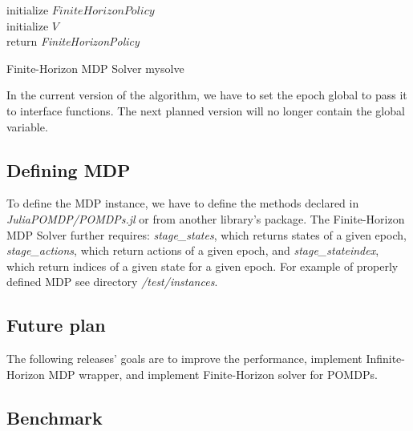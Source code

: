  \LinesNumbered
\begin{algorithm}
\SetAlgoLined
initialize $FiniteHorizonPolicy$ \\
initialize $V$ \\
return \textit{FiniteHorizonPolicy}
\caption{Finite-Horizon MDP Solver mysolve}
\end{algorithm}

In the current version of the algorithm, we have to set the epoch global to pass it to interface functions. The next planned version will no longer contain the global variable.

\subsection{Defining MDP}

To define the MDP instance, we have to define the methods declared in \textit{JuliaPOMDP/POMDPs.jl} \cite{JMLR:v18:16-300} or from another library's package. The Finite-Horizon MDP Solver further requires: \textit{stage\_states}, which returns states of a given epoch, \textit{stage\_actions}, which return actions of a given epoch, and \textit{stage\_stateindex}, which return indices of a given state for a given epoch. For example of properly defined MDP see directory \textit{/test/instances}.
 

\subsection{Future plan}

The following releases' goals are to improve the performance, implement Infinite-Horizon MDP wrapper, and implement Finite-Horizon solver for POMDPs.


\subsection{Benchmark}


